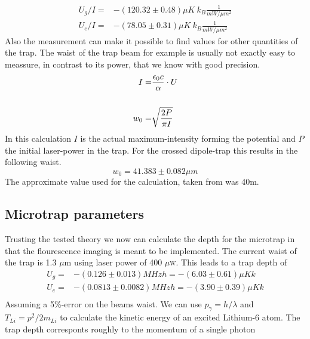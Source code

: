 \begin{align}
U_g/I=&-(120.32\pm 0.48)\unit{\mu K\ k_B\frac{1}{mW/\mu m^2}}\\
U_e/I=&-(78.05\pm 0.31)\unit{\mu K\ k_B\frac{1}{mW/\mu m^2}}
\end{align}
Also the measurement can make it possible to find values for other quantities of the trap. The waist of the trap beam for example is usually not exactly easy to meassure, in contrast to its power, that we know with good precision.
\begin{align}
I=&\frac{\epsilon_0 c}{\alpha}\cdot U\\\notag\\
w_0=&\sqrt{\frac{2P}{\pi I}}
\end{align}
In this calculation $I$ is the actual maximum-intensity forming the potential and $P$ the initial laser-power in the trap. For the crossed dipole-trap this results in the following waist.
\begin{equation}
w_0=41.383\pm 0.082\unit{\mu m}
\end{equation}
The approximate value used for the calculation, taken from \cite{lompe} was 40\mu m.

\subsection{Microtrap parameters}

Trusting the tested theory we now can calculate the depth for the microtrap in that the flourescence imaging is meant to be implemented. The current waist of the trap is 1.3 $\mu$m using laser power of 400 $\mu$\textsc{w}. This leads to a trap depth of
\begin{align}
U_g=&-(0.126\pm 0.013)\unit{MHz}h=-(6.03\pm 0.61)\unit{\mu K}k\\
U_e=&-(0.0813\pm 0.0082)\unit{MHz}h=-(3.90\pm 0.39)\unit{\mu K}k\\
\end{align}
Assuming a 5\%-error on the beams waist. We can use $p_\gamma=h/\lambda$ and $T_{Li}=p^2/2m_{Li}$ to calculate the kinetic energy of an excited Lithium-6 atom. The trap depth corresponts roughly to the momentum of a single photon	

